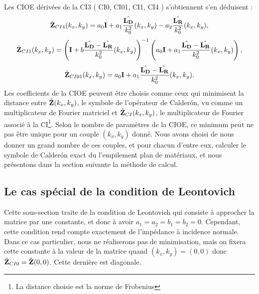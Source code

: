     Les CIOE dérivées de la CI3 ( CI0, CI01, CI1, CI4 ) s'obtiennent s'en déduisent :
    \begin{equation*}
      \hat{\mathbf{Z}}_{CI4}(k_x,k_y) = a_0 \mathbf{I} + a_1 \dfrac{\hat{\mathbf{L_D}}}{k_0^2}(k_x,k_y) - a_2 \dfrac{\hat{\mathbf{L_R}}}{k_0^2}(k_x,k_y),
    \end{equation*}
    \begin{equation*}
      \hat{\mathbf{Z}}_{CI1}(k_x,k_y) =  \left(\mathbf{I} + b \dfrac{\hat{\mathbf{L_D}} - \hat{\mathbf{L_R}}}{k_0^2}(k_x,k_y) \right)^{-1}\left(a_0\mathbf{I} + a_1 \dfrac{\hat{\mathbf{L_D}} - \hat{\mathbf{L_R}}}{k_0^2}(k_x,k_y) \right),
    \end{equation*}
    \begin{equation*}
      \hat{\mathbf{Z}}_{CI01}(k_x,k_y) =  a_0\mathbf{I} + a_1 \dfrac{\hat{\mathbf{L_D}} - \hat{\mathbf{L_R}}}{k_0^2}(k_x,k_y).
    \end{equation*}
    Les coefficients de la CIOE peuvent être choisis comme ceux qui minimisent la distance entre \(\hat{\mathbf{Z}}(k_x,k_y)\), le symbole de l'opérateur de Calderón, vu comme un multiplicateur de Fourier matriciel et \(\hat{\mathbf{Z}}_{CI}(k_x,k_y)\), le multiplicateur de Fourier associé à la CI\footnote{La distance choisie est la norme de Frobenius}.
    Selon le nombre de paramètres de la CIOE, ce minimum peut ne pas être unique pour un couple \((k_x,k_y)\) donné.
    Nous avons choisi de nous donner un grand nombre de ces couples, et pour chacun d'entre eux, calculer le symbole de Calderón exact du l'empilement plan de matériaux, et nous présentons dans la section suivante la méthode de calcul.

  \subsection{Le cas spécial de la condition de Leontovich}

    Cette sous-section traite de la condition de Leontovich qui consiste à approcher la matrice par une constante, et donc à avoir \(a_1=a_2=b_1=b_2=0\). Cependant, cette condition rend compte exactement de l'impédance à incidence normale. Dans ce cas particulier, nous ne réaliserons pas de minimisation, mais on fixera cette constante à la valeur de la matrice quand \((k_x,k_y) = (0,0)\) donc \( \hat{\mathbf{Z}}_{CI0}  = \hat{\mathbf{Z}}(0,0)\). Cette dernière est diagonale.
